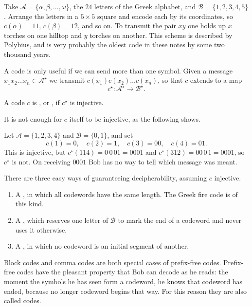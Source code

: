 \documentclass[a4paper]{scrartcl}
\newcommand{\Ac}{\mathcal{A}}
\newcommand{\Bc}{\mathcal{B}}
\begin{document}
\begin{example}
	Take $\Ac = \{\alpha, \beta, \dots, \omega\}$, the $24$ letters of the Greek alphabet, and $\Bc = \{1,2,3,4,5\}$. Arrange the letters in a $5 \times 5$ square and encode each by its coordinates, so $c(\alpha) = 11$, $c(\beta) = 12$, and so on. To transmit the pair $xy$ one holds up $x$ torches on one hilltop and $y$ torches on another. This scheme is described by Polybius, and is very probably the oldest code in these notes by some two thousand years.
\end{example}

A code is only useful if we can send more than one symbol. Given a message $x_1 x_2 \dots x_n \in \Ac^\star$ we transmit $c(x_1)c(x_2)\dots c(x_n)$, so that $c$ extends to a map
$$c^\star \colon \Ac^\star \to \Bc^\star.$$

\begin{definition}[Decipherable]
	A code $c$ is , or , if $c^\star$ is injective.
\end{definition}

It is not enough for $c$ itself to be injective, as the following shows.

\begin{example}
	Let $\Ac = \{1,2,3,4\}$ and $\Bc = \{0,1\}$, and set
	$$c(1) = 0, \quad c(2) = 1, \quad c(3) = 00, \quad c(4) = 01.$$
	This is injective, but $c^\star(114) = 0\,0\,01 = 0001$ and $c^\star(312) = 00\,0\,1 = 0001$, so $c^\star$ is not. On receiving $0001$ Bob has no way to tell which message was meant.
\end{example}

There are three easy ways of guaranteeing decipherability, assuming $c$ injective.

\begin{enumerate}[label=(\roman*)]
	\item A , in which all codewords have the same length. The Greek fire code is of this kind.
	\item A , which reserves one letter of $\Bc$ to mark the end of a codeword and never uses it otherwise.
	\item A , in which no codeword is an initial segment of another.
\end{enumerate}

Block codes and comma codes are both special cases of prefix-free codes. Prefix-free codes have the pleasant property that Bob can decode as he reads: the moment the symbols he has seen form a codeword, he knows that codeword has ended, because no longer codeword begins that way. For this reason they are also called  codes.
\end{document}
